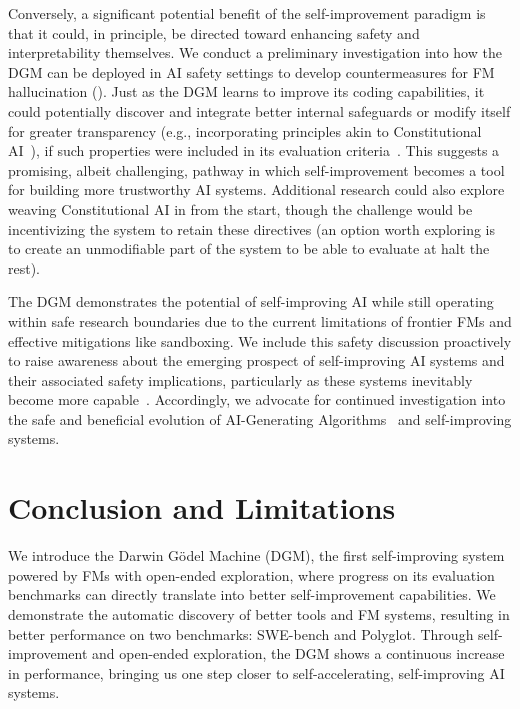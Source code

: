 \documentclass{article}
\begin{document}
Conversely, a significant potential benefit of the self-improvement paradigm is that it could, in principle, be directed toward enhancing safety and interpretability themselves. We conduct a preliminary investigation into how the DGM can be deployed in AI safety settings to develop countermeasures for FM hallucination (). Just as the DGM learns to improve its coding capabilities, it could potentially discover and integrate better internal safeguards or modify itself for greater transparency (e.g., incorporating principles akin to Constitutional AI~\citep{bai2022constitutional}), if such properties were included in its evaluation criteria~\citep{rosser2025agentbreeder}. This suggests a promising, albeit challenging, pathway in which self-improvement becomes a tool for building more trustworthy AI systems. Additional research could also explore weaving Constitutional AI in from the start, though the challenge would be incentivizing the system to retain these directives (an option worth exploring is to create an unmodifiable part of the system to be able to evaluate at halt the rest).

The DGM demonstrates the potential of self-improving AI while still operating within safe research boundaries due to the current limitations of frontier FMs and effective mitigations like sandboxing. We include this safety discussion proactively to raise awareness about the emerging prospect of self-improving AI systems and their associated safety implications, particularly as these systems inevitably become more capable~\citep{yudkowsky2008artificial, bostrom2002a,ecoffet2020open, bengio2024managing,clune2019ai}. Accordingly, we advocate for continued investigation into the safe and beneficial evolution of AI-Generating Algorithms~\citep{clune2019ai} and self-improving systems.

\section{Conclusion and Limitations}
\label{sec:conclusion}

We introduce the Darwin G\"odel Machine (DGM), the first self-improving system powered by FMs with open-ended exploration, where progress on its evaluation benchmarks can directly translate into better self-improvement capabilities. We demonstrate the automatic discovery of better tools and FM systems, resulting in better performance on two benchmarks: SWE-bench and Polyglot. Through self-improvement and open-ended exploration, the DGM shows a continuous increase in performance, bringing us one step closer to self-accelerating, self-improving AI systems.
\end{document}
